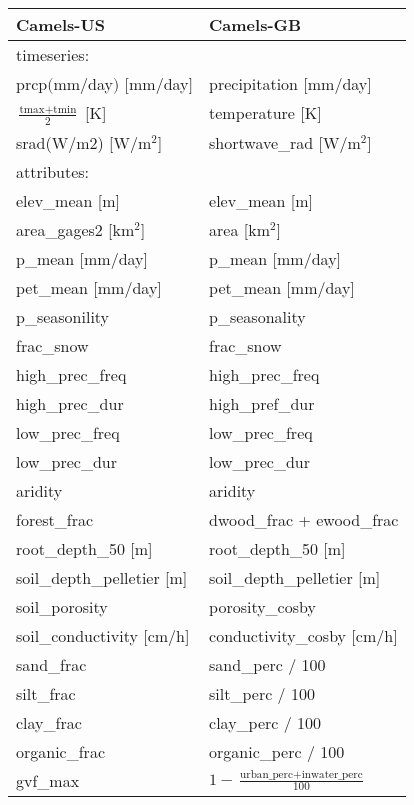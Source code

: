\begin{tabular}{l|l}
\toprule
Camels-US &     Camels-GB \\
\midrule
timeseries: & \\
\midrule
prcp$($mm$/$day$)$ $[$mm$/$day$]$ & precipitation [mm/day] \\
    $\frac{\text{tmax} + \text{tmin}}{2}$ [K] & temperature [K]\\
    srad(W/m2) [W$/$m$^2$] & shortwave\_rad [W$/$m$^2$] \\
\midrule
    attributes: & \\
\midrule
elev\_mean [m]  & elev\_mean [m] \\
area\_gages2 [km$^2$] & area [km$^2$] \\
p\_mean [mm/day] & p\_mean [mm/day] \\
    pet\_mean [mm/day] & pet\_mean [mm/day] \\
p\_seasonility & p\_seasonality \\
frac\_snow & frac\_snow \\
high\_prec\_freq & high\_prec\_freq \\
    high\_prec\_dur & high\_pref\_dur \\
    low\_prec\_freq & low\_prec\_freq \\
    low\_prec\_dur & low\_prec\_dur \\
aridity & aridity \\
forest\_frac & dwood\_frac + ewood\_frac \\ 
root\_depth\_50 [m] & root\_depth\_50 [m] \\
soil\_depth\_pelletier [m] & soil\_depth\_pelletier [m] \\
soil\_porosity & porosity\_cosby \\
soil\_conductivity [cm/h] & conductivity\_cosby [cm/h] \\
sand\_frac & sand\_perc  / 100 \\
silt\_frac & silt\_perc / 100 \\ 
clay\_frac & clay\_perc  / 100 \\ 
organic\_frac & organic\_perc / 100 \\
    gvf\_max & $1 -\frac{\text{urban\_perc}+\text{inwater\_perc}}{100} $ \\
\end{tabular}

